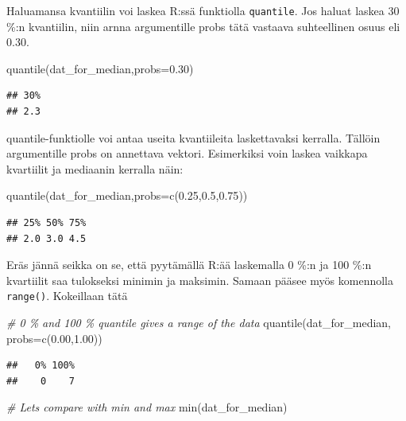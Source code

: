 \documentclass[
]{book}
\newenvironment{Shaded}{\begin{snugshade}}{\end{snugshade}}
\newcommand{\AttributeTok}[1]{\textcolor[rgb]{0.77,0.63,0.00}{#1}}
\newcommand{\CommentTok}[1]{\textcolor[rgb]{0.56,0.35,0.01}{\textit{#1}}}
\newcommand{\FloatTok}[1]{\textcolor[rgb]{0.00,0.00,0.81}{#1}}
\newcommand{\FunctionTok}[1]{\textcolor[rgb]{0.00,0.00,0.00}{#1}}
\newcommand{\NormalTok}[1]{#1}
\begin{document}
Haluamansa kvantiilin voi laskea R:ssä funktiolla \texttt{quantile}. Jos haluat laskea 30 \%:n kvantiilin, niin arnna argumentille probs tätä vastaava suhteellinen osuus eli 0.30.

\begin{Shaded}
\begin{Highlighting}[]
\FunctionTok{quantile}\NormalTok{(dat\_for\_median,}\AttributeTok{probs=}\FloatTok{0.30}\NormalTok{)}
\end{Highlighting}
\end{Shaded}

\begin{verbatim}
## 30% 
## 2.3
\end{verbatim}

quantile-funktiolle voi antaa useita kvantiileita laskettavaksi kerralla. Tällöin argumentille probs on annettava vektori. Esimerkiksi voin laskea vaikkapa kvartiilit ja mediaanin kerralla näin:

\begin{Shaded}
\begin{Highlighting}[]
\FunctionTok{quantile}\NormalTok{(dat\_for\_median,}\AttributeTok{probs=}\FunctionTok{c}\NormalTok{(}\FloatTok{0.25}\NormalTok{,}\FloatTok{0.5}\NormalTok{,}\FloatTok{0.75}\NormalTok{))}
\end{Highlighting}
\end{Shaded}

\begin{verbatim}
## 25% 50% 75% 
## 2.0 3.0 4.5
\end{verbatim}

Eräs jännä seikka on se, että pyytämällä R:ää laskemalla 0 \%:n ja 100 \%:n kvartiilit saa tulokseksi minimin ja maksimin. Samaan pääsee myös komennolla \texttt{range()}. Kokeillaan tätä

\begin{Shaded}
\begin{Highlighting}[]
\CommentTok{\# 0 \% and 100 \% quantile gives a range of the data}
\FunctionTok{quantile}\NormalTok{(dat\_for\_median, }\AttributeTok{probs=}\FunctionTok{c}\NormalTok{(}\FloatTok{0.00}\NormalTok{,}\FloatTok{1.00}\NormalTok{))}
\end{Highlighting}
\end{Shaded}

\begin{verbatim}
##   0% 100% 
##    0    7
\end{verbatim}

\begin{Shaded}
\begin{Highlighting}[]
\CommentTok{\# Let\textquotesingle{}s compare with min and max}
\FunctionTok{min}\NormalTok{(dat\_for\_median)}
\end{Highlighting}
\end{Shaded}
\end{document}
